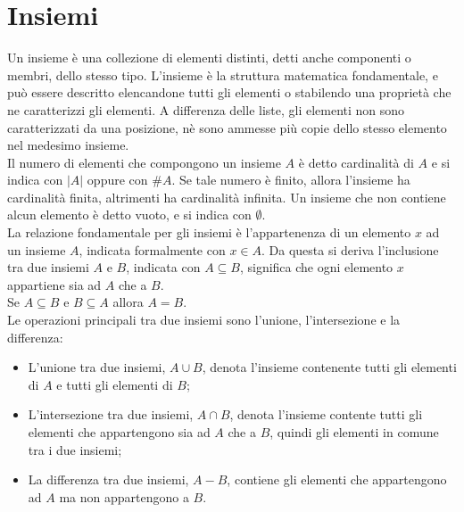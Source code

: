 \documentclass[12pt]{report}
\begin{document}
\chapter{Insiemi}
Un insieme è una collezione di elementi distinti, detti anche componenti o membri, dello stesso tipo. L'insieme è la struttura matematica fondamentale, e può essere descritto elencandone tutti gli elementi o stabilendo una proprietà che ne caratterizzi gli elementi. A differenza delle liste, gli elementi non sono caratterizzati da una posizione, nè sono ammesse più copie dello stesso elemento nel medesimo insieme. \\
Il numero di elementi che compongono un insieme $A$ è detto cardinalità di $A$ e si indica con $|A|$ oppure con $\# A$. Se tale numero è finito, allora l'insieme ha cardinalità finita, altrimenti ha cardinalità infinita. Un insieme che non contiene alcun elemento è detto vuoto, e si indica con $\emptyset$. \\
La relazione fondamentale per gli insiemi è l'appartenenza di un elemento $x$ ad un insieme $A$, indicata formalmente con $x \in A$. Da questa si deriva l'inclusione tra due insiemi $A$ e $B$, indicata con $A \subseteq B$, significa che ogni elemento $x$ appartiene sia ad $A$ che a $B$.\\
Se $A \subseteq B$ e $B \subseteq A$ allora $A = B$. \\
Le operazioni principali tra due insiemi sono l'unione, l'intersezione e la differenza:
\begin{itemize}
	\item L'unione tra due insiemi, $A \cup B$, denota l'insieme contenente tutti gli elementi di $A$ e tutti gli elementi di $B$;
	\item L'intersezione tra due insiemi,  $A \cap B$, denota l'insieme contente tutti gli elementi che appartengono sia ad $A$ che a $B$, quindi gli elementi in comune tra i due insiemi;
	\item La differenza tra due insiemi, $A - B$, contiene gli elementi che appartengono ad $A$ ma non appartengono a $B$.
\end{itemize}
\end{document}
